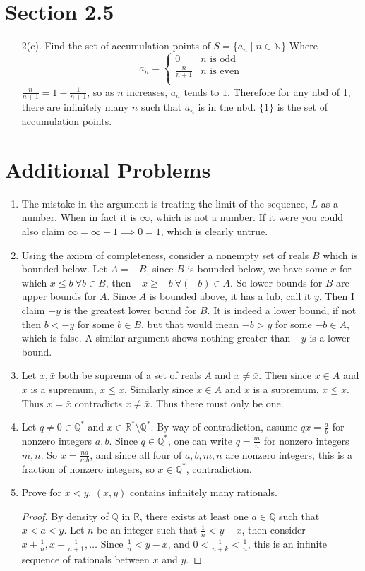 \documentclass[hidelinks,12pt]{article}
\renewcommand{\geq}{\geqslant}
\renewcommand{\leq}{\leqslant}
\newcommand{\R}{\mathbb{R}}
\newcommand{\N}{\mathbb{N}}
\newcommand{\Q}{\mathbb{Q}}
\begin{document}
\section*{Section 2.5}
\begin{enumerate}
    \item[2(c).] Find the set of accumulation points of $S=\{a_n\mid n\in\N\}$ Where $$a_n=\begin{cases}
        0 & n \text{ is odd}\\
        \frac{n}{n+1} & n \text{ is even}\\
    \end{cases}$$ $\frac{n}{n+1}=1-\frac{1}{n+1}$, so as $n$ increases, $a_n$ tends to $1$. Therefore for any nbd of 1, there are infinitely many $n$ such that $a_n$ is in the nbd. $\{1\}$ is the set of accumulation points.
\end{enumerate}
\section*{Additional Problems}
\begin{enumerate}
    \item The mistake in the argument is treating the limit of the sequence, $L$ as a number. When in fact it is $\infty$, which is not a number. If it were you could also claim $\infty=\infty+1\implies 0=1$, which is clearly untrue.
    \item Using the axiom of completeness, consider a nonempty set of reals $B$ which is bounded below. Let $A=-B$, since $B$ is bounded below, we have some $x$ for which $x\leq b\ \forall b\in B$, then $-x\geq -b\ \forall (-b)\in A$. So lower bounds for $B$ are upper bounds for $A$. Since $A$ is bounded above, it has a lub, call it $y$. Then I claim $-y$ is the greatest lower bound for $B$. It is indeed a lower bound, if not then $b<-y$ for some $b\in B$, but that would mean $-b>y$ for some $-b\in A$, which is false. A similar argument shows nothing greater than $-y$ is a lower bound.
    \item Let $x,\bar{x}$ both be suprema of a set of reals $A$ and $x\neq\bar{x}$. Then since $x\in A$ and $\bar{x}$ is a supremum, $x\leq \bar{x}$. Similarly since $\bar{x}\in A$ and $x$ is a supremum, $\bar{x}\leq x$. Thus $x=\bar{x}$ contradicts $x\neq\bar{x}$. Thus there must only be one.
    \item Let $q\neq0\in\Q^*$ and $x\in\R^*\setminus\Q^*$. By way of contradiction, assume $qx=\frac{a}{b}$ for nonzero integers $a,b$. Since $q\in\Q^*$, one can write $q=\frac{m}{n}$ for nonzero integers $m,n$. So $x=\frac{na}{mb}$, and since all four of $a,b,m,n$ are nonzero integers, this is a fraction of nonzero integers, so $x\in\Q^*$, contradiction.
    \item Prove for $x<y$, $(x,y)$ contains infinitely many rationals.\begin{proof}
    By density of $\Q$ in $\R$, there exists at least one $a\in\Q$ such that $x<a<y$. Let $n$ be an integer such that $\frac{1}{n}<y-x$, then consider $x+\frac{1}{n},x+\frac{1}{n+1},\dots$ Since $\frac{1}{n}<y-x$, and $0<\frac{1}{n+k}<\frac{1}{n}$, this is an infinite sequence of rationals between $x$ and $y$.
    \end{proof}
\end{enumerate}
\end{document}
